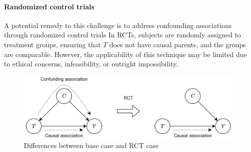 \paragraph*{Randomized control trials}
A potential remedy to this challenge is to address confounding associations through randomized control trials
In RCTs, subjects are randomly assigned to treatment groups, ensuring that $T$ does not have causal parents, and the groups are comparable.
However, the applicability of this technique may be limited due to ethical concerns, infeasibility, or outright impossibility.
\begin{figure}[H]
    \centering
    \includegraphics[width=0.75\linewidth]{images/cau2.png}
    \caption{Differences between base case and RCT case}
\end{figure}

